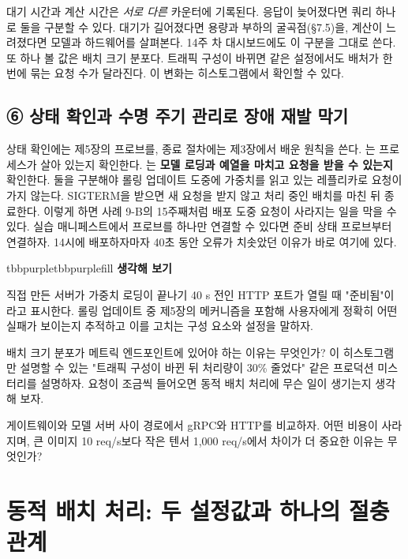 대기 시간과 계산 시간은 \textit{서로 다른} 카운터에 기록된다. 응답이 늦어졌다면 쿼리 하나로 둘을 구분할 수 있다. 대기가 길어졌다면 용량과 부하의 굴곡점(§7.5)을, 계산이 느려졌다면 모델과 하드웨어를 살펴본다. 14주 차 대시보드에도 이 구분을 그대로 쓴다. 또 하나 볼 값은 배치 크기 분포다. 트래픽 구성이 바뀌면 같은 설정에서도 배처가 한 번에 묶는 요청 수가 달라진다. 이 변화는 히스토그램에서 확인할 수 있다.

\subsection*{⑥ 상태 확인과 수명 주기 관리로 장애 재발 막기}

상태 확인에는 제5장의 프로브를, 종료 절차에는 제3장에서 배운 원칙을 쓴다. 는 프로세스가 살아 있는지 확인한다. 는 \textbf{모델 로딩과 예열을 마치고 요청을 받을 수 있는지} 확인한다. 둘을 구분해야 롤링 업데이트 도중에 가중치를 읽고 있는 레플리카로 요청이 가지 않는다. SIGTERM을 받으면 새 요청을 받지 않고 처리 중인 배치를 마친 뒤 종료한다. 이렇게 하면 사례 9-B의 15주째처럼 배포 도중 요청이 사라지는 일을 막을 수 있다. 실습 매니페스트에서 프로브를 하나만 연결할 수 있다면 준비 상태 프로브부터 연결하자. 14시에 배포하자마자 40초 동안 오류가 치솟았던 이유가 바로 여기에 있다.

\begin{calloutbox}{tbbpurple}{tbbpurplefill}
{\normalsize\bfseries\color{tbbpurple}생각해 보기}\par\vspace{3pt}
\begin{tbbitemize}
  \item 직접 만든 서버가 가중치 로딩이 끝나기 40 s 전인 HTTP 포트가 열릴 때 "준비됨"이라고 표시한다. 롤링 업데이트 중 제5장의 메커니즘을 포함해 사용자에게 정확히 어떤 실패가 보이는지 추적하고 이를 고치는 구성 요소와 설정을 말하자.
  \item 배치 크기 분포가 메트릭 엔드포인트에 있어야 하는 이유는 무엇인가? 이 히스토그램만 설명할 수 있는 "트래픽 구성이 바뀐 뒤 처리량이 30\% 줄었다" 같은 프로덕션 미스터리를 설명하자. 요청이 조금씩 들어오면 동적 배치 처리에 무슨 일이 생기는지 생각해 보자.
  \item 게이트웨이와 모델 서버 사이 경로에서 gRPC와 HTTP를 비교하자. 어떤 비용이 사라지며, 큰 이미지 10 req/s보다 작은 텐서 1,000 req/s에서 차이가 더 중요한 이유는 무엇인가?
\end{tbbitemize}
\end{calloutbox}

\section{동적 배치 처리: 두 설정값과 하나의 절충 관계}

